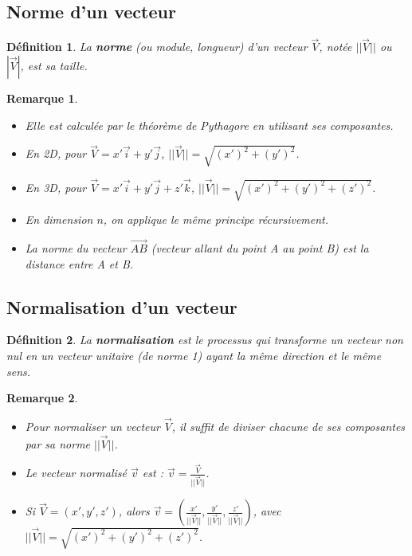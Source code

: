 \documentclass{article}
\newtheorem{definition}{Définition}
\newtheorem{remark}{Remarque}
\begin{document}
\subsection{Norme d'un vecteur}
\begin{definition}
La \textbf{norme} (ou module, longueur) d'un vecteur $\vec{V}$, notée $||\vec{V}||$ ou $|\vec{V}|$, est sa taille.
\end{definition}
\begin{remark}
\begin{itemize}
    \item Elle est calculée par le théorème de Pythagore en utilisant ses composantes.
    \item En 2D, pour $\vec{V} = x'\vec{i} + y'\vec{j}$, $||\vec{V}|| = \sqrt{(x')^2 + (y')^2}$.
    \item En 3D, pour $\vec{V} = x'\vec{i} + y'\vec{j} + z'\vec{k}$, $||\vec{V}|| = \sqrt{(x')^2 + (y')^2 + (z')^2}$.
    \item En dimension $n$, on applique le même principe récursivement.
    \item La norme du vecteur $\vec{AB}$ (vecteur allant du point A au point B) est la distance entre A et B.
\end{itemize}
\end{remark}
\subsection{Normalisation d'un vecteur}
\begin{definition}
La \textbf{normalisation} est le processus qui transforme un vecteur non nul en un vecteur unitaire (de norme 1) ayant la même direction et le même sens.
\end{definition}
\begin{remark}
\begin{itemize}
    \item Pour normaliser un vecteur $\vec{V}$, il suffit de diviser chacune de ses composantes par sa norme $||\vec{V}||$.
    \item Le vecteur normalisé $\vec{v}$ est : $\vec{v} = \frac{\vec{V}}{||\vec{V}||}$.
    \item Si $\vec{V} = (x', y', z')$, alors $\vec{v} = \left( \frac{x'}{||\vec{V}||}, \frac{y'}{||\vec{V}||}, \frac{z'}{||\vec{V}||} \right)$, avec $||\vec{V}|| = \sqrt{(x')^2 + (y')^2 + (z')^2}$.
\end{itemize}
\end{remark}
\end{document}
